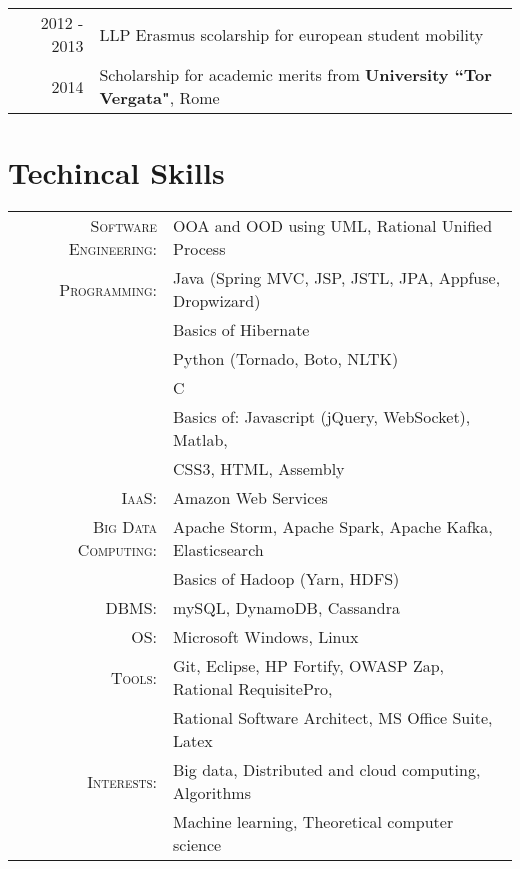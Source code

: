 \documentclass[a4paper,10pt]{article} %
\begin{document}
\begin{tabular}{rl}
2012 - 2013 & LLP Erasmus scolarship for european student mobility \\

2014 & Scholarship for academic merits from \textbf{University ``Tor Vergata"}, Rome\\
\end{tabular}




\section{Techincal Skills}

\begin{tabular}{rl}
\textsc{Software Engineering}: & OOA and OOD using UML, Rational Unified Process \\
\textsc{Programming}: & Java (Spring MVC, JSP, JSTL, JPA, Appfuse, Dropwizard) \\ & Basics of Hibernate
\\ & Python (Tornado, Boto, NLTK)
\\ & C
\\ & Basics of: Javascript (jQuery, WebSocket), Matlab, 
\\ & CSS3, HTML,  Assembly  \\
\textsc{IaaS}: & Amazon Web Services\\
\textsc{Big Data Computing}: & Apache Storm, Apache Spark, Apache Kafka, Elasticsearch \\
& Basics of Hadoop (Yarn, HDFS) \\
\textsc{DBMS}: & mySQL, DynamoDB, Cassandra\\
\textsc{OS}: & Microsoft Windows, Linux\\
\textsc{Tools}: & Git, Eclipse, HP Fortify, OWASP Zap, Rational RequisitePro, \\ & Rational Software Architect, MS Office Suite, Latex \\
\textsc{Interests}: & Big data, Distributed and cloud computing, Algorithms \\ & Machine learning, Theoretical computer science
\end{tabular}
\end{document}
